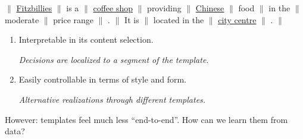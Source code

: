 \begin{frame}
$\|$ \underline{Fitzbillies} $\|$  \pause is a $\|$ \pause   \underline{coffee shop} $\|$ \pause  providing $\|$  \underline{Chinese} $\|$ food $\|$ in the $\|$  moderate $\|$ price range $\|$ . $\|$ It is  $\|$ located in the $\|$ \underline{city centre} $\|$ . $\|$





\end{frame}


\begin{frame}

\begin{enumerate}
\item Interpretable in its content selection.
  \air

  \textit{Decisions are localized to a segment of the template.}

  \air

\item Easily controllable in terms of style and form.
  \air

  \textit{Alternative realizations through different templates.}
\end{enumerate}


\air

\pause



\alert{However:} templates feel much less ``end-to-end''. 
How can we learn them from data?

\end{frame}

